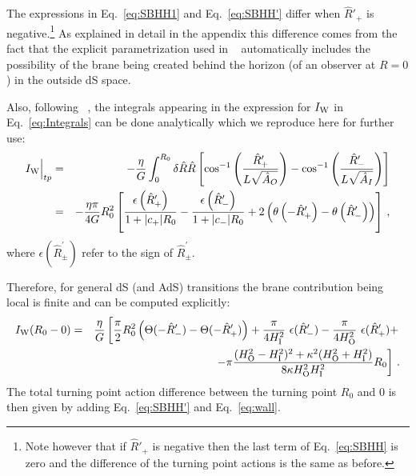 \documentclass[a4paper,11pt]{article}
\numberwithin{equation}{section}
\numberwithin{equation}{section}
\begin{document}
The expressions in Eq.~\eqref{eq:SBHH1} and Eq.~\eqref{eq:SBHH'} differ when $\hat R'_+$ is negative.\footnote{Note however that if $\hat R'_+$ is negative then the last term of Eq.~\eqref{eq:SBHH} is zero and the difference of the turning point actions is the same as before.} As explained in detail in the appendix this difference comes from the fact that the explicit parametrization used in
~\cite{DeAlwis:2019rxg} automatically includes the possibility of the brane being created behind the horizon (of an observer at  $R=0$) in the outside dS space.

Also, following ~\cite{DeAlwis:2019rxg}, the integrals appearing in the expression for $I_{\rm W}$ in Eq.~\eqref{eq:Integrals} can be done analytically which we reproduce here for further use: %
\begin{eqnarray}
I_{\rm W}\Big |_{tp} &=& -\frac{\eta}{G} \int_0^{R_0} \delta \hat R \hat R\left [\cos^{-1}\left(\frac{\hat R'_+}{L\sqrt{\hat A_O}}\right)-\cos^{-1}\left(\frac{\hat R'_-}{L\sqrt{\hat A_I}}\right)\right ]\\ \nonumber
&= & -\frac{\eta \pi}{4G} R_0^2\left[\frac{\epsilon\left(\hat R'_+\right)}{1+|c_+|R_0}-\frac{\epsilon\left(\hat R'_-\right)}{1+|c_-|R_0}+2\left(\theta\left(-\hat R'_+\right)-\theta\left(\hat R'_-\right)\right)\right] \,,
\end{eqnarray}
where $ \epsilon(\hat R^{\prime}_{\pm})$ refer to the sign of $ \hat R^{\prime}_{\pm} $. 

Therefore, for general dS (and AdS) transitions the brane contribution being local is finite and can be computed explicitly:
\begin{eqnarray}\notag
I_{\rm W}(R_0-0) %
 &= &\frac{\eta}{G} \left[\frac{\pi}{2}R_{0}^{2} \left(\Theta(-\hat R^{\prime}_{-})-\Theta(-\hat R^{\prime}_{+})\right)+\frac{\pi}{4H_{\rm I}^{2}}\ \epsilon(\hat R^{\prime}_{-})-\frac{\pi}{4H_{\rm O}^{2}}\ \epsilon(\hat R^{\prime}_{+}) + \right. \\
&& \,\,\,\,\, \left.- \pi \frac{(H_{\rm O}^{2}-H_{\rm I}^{2})^{2}+\kappa^{2}(H_{\rm O}^{2}+H_{\rm I}^{2})}{8\kappa H_{\rm O}^{2} H_{\rm I}^{2}} R_{0} \right] \,. 
\label{eq:wall} 
\end{eqnarray} 
The total turning point action difference between the turning point $R_0$ and $0$ is then given by adding Eq.~\eqref{eq:SBHH'} and Eq.~\eqref{eq:wall}.
\end{document}
